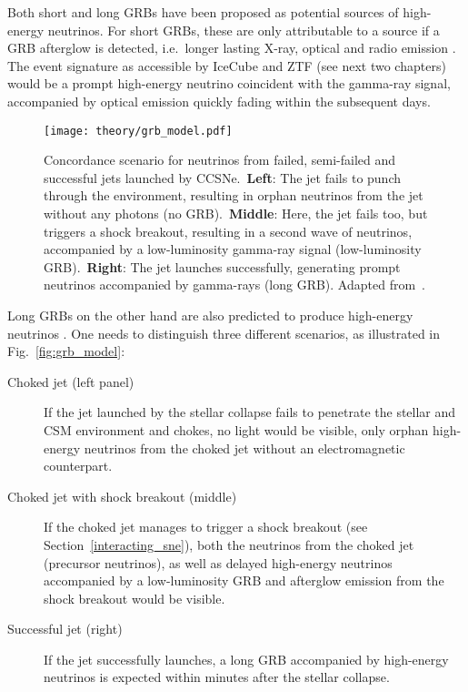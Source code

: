 Both short and long GRBs have been proposed as potential sources of high-energy neutrinos. For short GRBs, these are only attributable to a source if a GRB afterglow is detected, i.e.\ longer lasting X-ray, optical and radio emission . The event signature as accessible by IceCube and ZTF (see next two chapters) would be a prompt high-energy neutrino coincident with the gamma-ray signal, accompanied by optical emission quickly fading within the subsequent days.

\begin{figure}[htb]
    \texttt{[image: theory/grb\_model.pdf]}
    \caption[High-energy neutrinos from GRBs]{Concordance scenario for neutrinos from failed, semi-failed and successful jets launched by CCSNe.\ \textbf{Left}: The jet fails to punch through the environment, resulting in orphan neutrinos from the jet without any photons (no GRB).\ \textbf{Middle}: Here, the jet fails too, but triggers a shock breakout, resulting in a second wave of neutrinos, accompanied by a low-luminosity gamma-ray signal (low-luminosity GRB).\ \textbf{Right}: The jet launches successfully, generating prompt neutrinos accompanied by gamma-rays (long GRB). Adapted from~\cite{Senno2016}.}
\end{figure}

Long GRBs on the other hand are also predicted to produce high-energy neutrinos . One needs to distinguish three different scenarios, as illustrated in Fig.~\ref{fig:grb_model}:
\begin{description}
    \item[Choked jet (left panel)] If the jet launched by the stellar collapse fails to penetrate the stellar and CSM environment and chokes, no light would be visible, only orphan high-energy neutrinos from the choked jet without an electromagnetic counterpart.
    \item[Choked jet with shock breakout (middle)] If the choked jet manages to trigger a shock breakout (see Section~\ref{interacting_sne}), both the neutrinos from the choked jet (precursor neutrinos), as well as delayed high-energy neutrinos accompanied by a low-luminosity GRB and afterglow emission from the shock breakout would be visible.
    \item[Successful jet (right)] If the jet successfully launches, a long GRB accompanied by high-energy neutrinos is expected within minutes after the stellar collapse.
\end{description}


